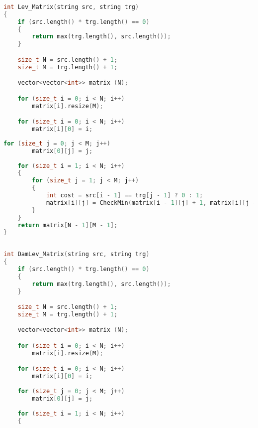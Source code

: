         \begin{lstlisting}[language=C++, label=lst:matr:Levenstein1, caption=Функция поиска расстояния Левенштейна нерекурсивно]
        	
int Lev_Matrix(string src, string trg)
{
    if (src.length() * trg.length() == 0)
    {
        return max(trg.length(), src.length());
    }

    size_t N = src.length() + 1;
    size_t M = trg.length() + 1;

    vector<vector<int>> matrix (N);

    for (size_t i = 0; i < N; i++)
        matrix[i].resize(M);

    for (size_t i = 0; i < N; i++)
        matrix[i][0] = i;
   \end{lstlisting}
\par   \text{~~~~~~}
   \begin{lstlisting}[language=C++, label=lst:matr:Levenstein2, caption=Функция поиска расстояния Левенштейна нерекурсивно]
    for (size_t j = 0; j < M; j++)
        matrix[0][j] = j;
    
    for (size_t i = 1; i < N; i++)
    {
        for (size_t j = 1; j < M; j++)
        {
            int cost = src[i - 1] == trg[j - 1] ? 0 : 1;
            matrix[i][j] = CheckMin(matrix[i - 1][j] + 1, matrix[i][j - 1] + 1, matrix[i - 1][j - 1] + cost);
        }
    }
    return matrix[N - 1][M - 1];
}
        \end{lstlisting}
	
        \begin{lstlisting}[language=C++, label=lst:matr:DamLevenstein1, caption=Функция поиска расстояния Дамерау-Левенштейна с использованием матрицы]
        	
int DamLev_Matrix(string src, string trg)
{
    if (src.length() * trg.length() == 0)
    {
        return max(trg.length(), src.length());
    }

    size_t N = src.length() + 1;
    size_t M = trg.length() + 1;

    vector<vector<int>> matrix (N);

    for (size_t i = 0; i < N; i++)
        matrix[i].resize(M);

    for (size_t i = 0; i < N; i++)
        matrix[i][0] = i;
    
    for (size_t j = 0; j < M; j++)
        matrix[0][j] = j;
    
    for (size_t i = 1; i < N; i++)
    {
	\end{lstlisting}

